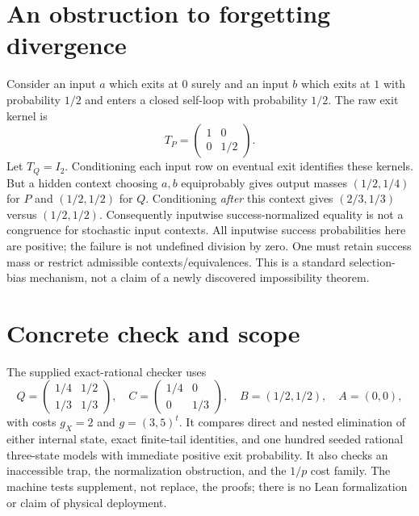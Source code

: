 \documentclass[11pt]{article}
\begin{document}
\section{An obstruction to forgetting divergence}
Consider an input $a$ which exits at $0$ surely and an input $b$ which exits at $1$ with probability $1/2$ and enters a closed self-loop with probability $1/2$. The raw exit kernel is
\[T_P=\begin{pmatrix}1&0\\0&1/2\end{pmatrix}.
\]
Let $T_Q=I_2$. Conditioning each input row on eventual exit identifies these kernels. But a hidden context choosing $a,b$ equiprobably gives output masses $(1/2,1/4)$ for $P$ and $(1/2,1/2)$ for $Q$. Conditioning \emph{after} this context gives $(2/3,1/3)$ versus $(1/2,1/2)$. Consequently inputwise success-normalized equality is not a congruence for stochastic input contexts. All inputwise success probabilities here are positive; the failure is not undefined division by zero. One must retain success mass or restrict admissible contexts/equivalences. This is a standard selection-bias mechanism, not a claim of a newly discovered impossibility theorem.

\section{Concrete check and scope}
The supplied exact-rational checker uses
\[Q=\begin{pmatrix}1/4&1/2\\1/3&1/3\end{pmatrix},\quad C=\begin{pmatrix}1/4&0\\0&1/3\end{pmatrix},\quad B=(1/2,1/2),\quad A=(0,0),
\]
with costs $g_X=2$ and $g=(3,5)^t$. It compares direct and nested elimination of either internal state, exact finite-tail identities, and one hundred seeded rational three-state models with immediate positive exit probability. It also checks an inaccessible trap, the normalization obstruction, and the $1/p$ cost family. The machine tests supplement, not replace, the proofs; there is no Lean formalization or claim of physical deployment.
\end{document}
